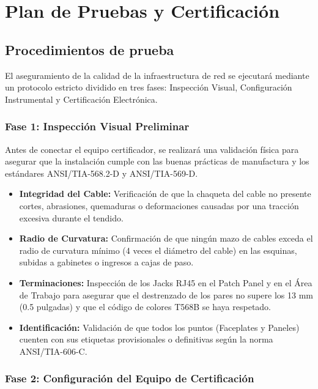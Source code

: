 \chapter{Plan de Pruebas y Certificación}

\section{Procedimientos de prueba}

El aseguramiento de la calidad de la infraestructura de red se ejecutará mediante un protocolo estricto dividido en tres fases: Inspección Visual, Configuración Instrumental y Certificación Electrónica.

\subsection*{Fase 1: Inspección Visual Preliminar}

Antes de conectar el equipo certificador, se realizará una validación física para asegurar que la instalación cumple con las buenas prácticas de manufactura y los estándares ANSI/TIA-568.2-D y ANSI/TIA-569-D.

\begin{itemize}
    \item \textbf{Integridad del Cable:} Verificación de que la chaqueta del cable no presente cortes, abrasiones, quemaduras o deformaciones causadas por una tracción excesiva durante el tendido.
    \item \textbf{Radio de Curvatura:} Confirmación de que ningún mazo de cables exceda el radio de curvatura mínimo (4 veces el diámetro del cable) en las esquinas, subidas a gabinetes o ingresos a cajas de paso.
    \item \textbf{Terminaciones:} Inspección de los Jacks RJ45 en el Patch Panel y en el Área de Trabajo para asegurar que el destrenzado de los pares no supere los 13 mm (0.5 pulgadas) y que el código de colores T568B se haya respetado.
    \item \textbf{Identificación:} Validación de que todos los puntos (Faceplates y Paneles) cuenten con sus etiquetas provisionales o definitivas según la norma ANSI/TIA-606-C.
\end{itemize}

\subsection*{Fase 2: Configuración del Equipo de Certificación}

